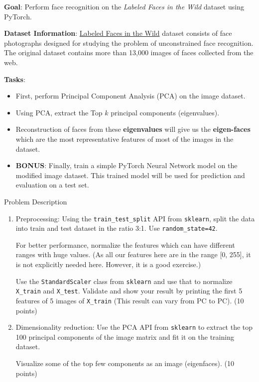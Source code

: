 \documentclass[11pt,letterpaper]{article}
\begin{document}
\begin{enumerate}
\textbf{Goal}: Perform face recognition on the \emph{Labeled Faces in the Wild} dataset using PyTorch.

\textbf{Dataset Information}: \href{http://vis-www.cs.umass.edu/lfw/}{Labeled Faces in the Wild} dataset consists of face photographs designed for studying the problem of unconstrained face recognition. The original dataset contains more than 13,000 images of faces collected from the web.

\textbf{Tasks}:
\begin{itemize}
    \item First, perform Principal Component Analysis (PCA) on the image dataset.
    \item Using PCA, extract the Top $k$ principal components (eigenvalues).
    \item Reconstruction of faces from these \textbf{eigenvalues} will give us the \textbf{eigen-faces} which are the most representative features of most of the images in the dataset.
    \item \textbf{BONUS}: Finally, train a simple PyTorch Neural Network model on the modified image dataset. This trained model will be used for prediction and evaluation on a test set.
\end{itemize}

Problem Description
\begin{enumerate}[label=(\alph*)]
\item Preprocessing: Using the \texttt{train\_test\_split} API from  \texttt{sklearn}, split the data into train and test dataset in the ratio 3:1. Use  \texttt{random\_state=42}.

For better performance, normalize the features which can have different ranges with huge values. (As all our features here are in the range [0, 255],  it is not explicitly needed here. However, it is a good exercise.)

Use the  \texttt{StandardScaler} class from  \texttt{sklearn} and use that to normalize  \texttt{X\_train} and  \texttt{X\_test}. Validate and show your result by printing the first 5 features of 5 images of  \texttt{X\_train} (This result can vary from PC to PC). (10 points)

\item Dimensionality reduction: 
Use the PCA API from \texttt{sklearn} to extract the top 100 principal components of the image matrix and fit it on the training dataset.

Visualize some of the top few components as an image (eigenfaces). (10 points)


\end{enumerate}
\end{enumerate}
\end{document}
